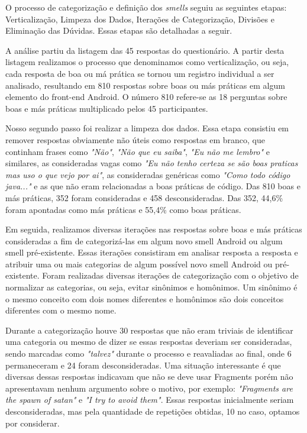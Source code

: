 O processo de categoriza\c{c}\~ao e defini\c{c}\~ao dos \textit{smells} seguiu as seguintes etapas: Verticaliza\c{c}\~ao, Limpeza dos Dados, Itera\c{c}\~oes de Categoriza\c{c}\~ao, Divis\~oes e Elimina\c{c}\~ao das D\'uvidas. Essas etapas s\~ao detalhadas a seguir.

A an\'alise partiu da listagem das 45 respostas do question\'ario. A partir desta listagem realizamos o processo que denominamos como verticaliza\c{c}\~ao, ou seja, cada resposta de boa ou m\'a pr\'atica se tornou um registro individual a ser analisado, resultando em 810 respostas sobre boas ou m\'as pr\'aticas em algum elemento do front-end Android. O n\'umero 810 refere-se as 18 perguntas sobre boas e m\'as pr\'aticas multiplicado pelos 45 participantes.

Nosso segundo passo foi realizar a limpeza dos dados. Essa etapa consistiu em remover respostas obviamente n\~ao \'uteis como respostas em branco, que continham frases como \textit{"N\~ao"}, \textit{"N\~ao que eu saiba"}, \textit{"Eu n\~ao me lembro"} e similares, as consideradas vagas como \textit{"Eu n\~ao tenho certeza se s\~ao boas praticas mas uso o que vejo por ai"}, as consideradas gen\'ericas como \textit{"Como todo c\'odigo java..."} e as que n\~ao eram relacionadas a boas pr\'aticas de c\'odigo. Das 810 boas e m\'as pr\'aticas, 352 foram consideradas e 458 desconsideradas. Das 352, 44,6\% foram apontadas como m\'as pr\'aticas e 55,4\% como boas pr\'aticas. 

Em seguida, realizamos diversas itera\c{c}\~oes nas respostas sobre boas e m\'as pr\'aticas consideradas a fim de categoriz\'a-las em algum novo smell Android ou algum smell pr\'e-existente. Essas itera\c{c}\~oes consistiram em analisar resposta a resposta e atribuir uma ou mais categorias de algum poss\'ivel novo smell Android ou pr\'e-existente. Foram realizadas diversas itera\c{c}\~oes de categoriza\c{c}\~ao com o objetivo de normalizar as categorias, ou seja, evitar sin\^onimos e hom\^onimos. Um sin\^onimo \'e o mesmo conceito com dois nomes diferentes e hom\^onimos s\~ao dois conceitos diferentes com o mesmo nome. 

Durante a categoriza\c{c}\~ao houve 30 respostas que n\~ao eram triviais de identificar uma categoria ou mesmo de dizer se essas respostas deveriam ser consideradas, sendo marcadas como \textit{"talvez"} durante o processo e reavaliadas ao final, onde 6 permaneceram e 24 foram desconsideradas. Uma situa\c{c}\~ao interessante \'e que diversas dessas respostas indicavam que n\~ao se deve usar Fragments por\'em n\~ao apresentavam nenhum argumento sobre o motivo, por exemplo: \textit{"Fragments are the spawn of satan"} e \textit{"I try to avoid them"}. Essas respostas inicialmente seriam desconsideradas, mas pela quantidade de repeti\c{c}\~oes obtidas, 10 no caso, optamos por considerar.

